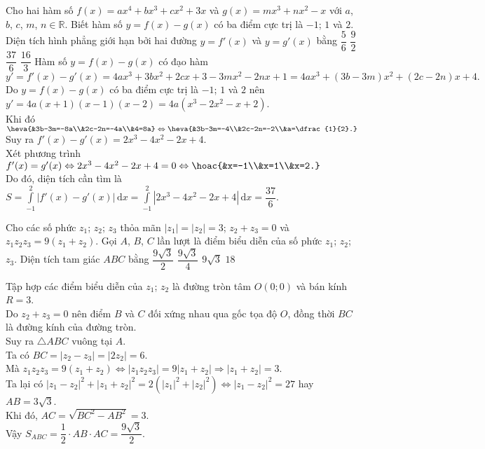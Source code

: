 \begin{ex}%
	Cho hai hàm số $f(x)=ax^4+bx^3+cx^2+3x$ và $g(x)=mx^3+nx^2-x$ với $a$, $b$, $c$, $m$, $n\in\mathbb{R}$. Biết hàm số $y=f(x)-g(x)$ có ba điểm cực trị là $-1$; $1$ và $2$. Diện tích hình phẳng giới hạn bởi hai đường $y=f'(x)$ và $y=g'(x)$ bằng
	\choice
	{$\dfrac{5}{6}$}
	{$\dfrac{9}{2}$}
	{\True $\dfrac{37}{6}$}
	{$\dfrac{16}{3}$}
	\loigiai
	{
	Hàm số $y=f(x)-g(x)$ có đạo hàm $$y'=f'(x)-g'(x)=4ax^3+3bx^2+2cx+3-3mx^2-2nx+1=4ax^3+(3b-3m)x^2+(2c-2n)x+4.$$
	Do $y=f(x)-g(x)$ có ba điểm cực trị là $-1$; $1$ và $2$ nên $y'=4a(x+1)(x-1)(x-2)=4a(x^3-2x^2-x+2)$.\\
	Khi đó $\heva{&3b-3m=-8a\\&2c-2n=-4a\\&4=8a}\Leftrightarrow\heva{&3b-3m=-4\\&2c-2n=-2\\&a=\dfrac{1}{2}.}$\\
	Suy ra $f'(x)-g'(x)=2x^3-4x^2-2x+4$.\\
	Xét phương trình $f'(x)=g'(x)\Leftrightarrow 2x^3-4x^2-2x+4=0\Leftrightarrow\hoac{&x=-1\\&x=1\\&x=2.}$\\ 
	Do đó, diện tích cần tìm là $S=\displaystyle\int\limits_{-1}^2\left|f'(x)-g'(x)\right|\mathrm{\,d}x=\displaystyle\int\limits_{-1}^2\left|2x^3-4x^2-2x+4\right|\mathrm{\,d}x=\dfrac{37}{6}$.
	}
\end{ex}
\begin{ex}%
Cho các số phức $z_1$; $z_2$; $z_3$ thỏa mãn $|z_1|=|z_2|=3$; $z_2+z_3=0$ và $z_1z_2z_3=9(z_1+z_2)$. Gọi $A$, $B$, $C$ lần lượt là điểm biểu diễn của số phức $z_1$; $z_2$; $z_3$. Diện tích tam giác $ABC$ bằng
	\choice
	{\True $\dfrac{9\sqrt{3}}{2}$}
	{$\dfrac{9\sqrt{3}}{4}$}
	{$9\sqrt{3}$}
	{$18$}
	\loigiai
	{
	\immini
	{
Tập hợp các điểm biểu diễn của $z_1$; $z_2$ là đường tròn tâm $O(0;0)$ và bán kính $R=3$.\\
Do $z_2+z_3=0$ nên điểm $B$ và $C$ đối xứng nhau qua gốc tọa độ $O$, đồng thời $BC$ là đường kính của đường tròn.\\
Suy ra $\triangle ABC$ vuông tại $A$.\\
Ta có $BC=|z_2-z_3|=|2z_2|=6$.\\
Mà $z_1z_2z_3=9(z_1+z_2)\Leftrightarrow |z_1z_2z_3|=9|z_1+z_2|\Rightarrow |z_1+z_2|=3$.\\
Ta lại có $|z_1-z_2|^2+|z_1+z_2|^2=2\left(|z_1|^2+|z_2|^2\right)\Leftrightarrow |z_1-z_2|^2=27$ hay $AB=3\sqrt{3}$.\\
Khi đó, $AC=\sqrt{BC^2-AB^2}=3$.\\
Vậy $S_{ABC}=\dfrac{1}{2}\cdot AB\cdot AC=\dfrac{9\sqrt{3}}{2}$.
}
{

}
	}
\end{ex}
